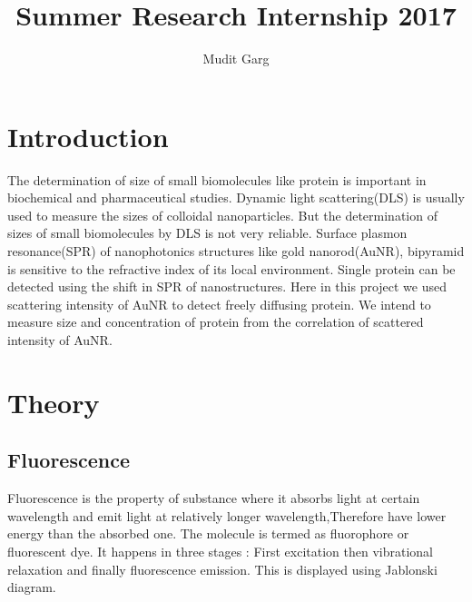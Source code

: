 \documentclass[twoside,single]{lion-msc}
\title{Summer Research Internship 2017}
\author{Mudit Garg}
\affiliation{Indian Institute of Technology Delhi}   %
\begin{document}


\maketitle

\tableofcontents
\cleardoublepage




\chapter{Introduction}

The determination of size of small biomolecules like protein is important in biochemical and pharmaceutical studies. Dynamic light scattering(DLS) is usually used to  measure the sizes of colloidal nanoparticles. But the determination of sizes of small biomolecules by DLS is not very reliable. Surface plasmon resonance(SPR) of nanophotonics structures like gold nanorod(AuNR), bipyramid is sensitive to the refractive index of its local environment. Single protein can be detected using the shift in SPR of nanostructures\cite{AuNR4}. Here in this project we used scattering intensity of AuNR to detect freely diffusing protein. We intend to measure size and concentration of protein from the correlation of scattered intensity of AuNR.
\chapter{Theory}

\section{Fluorescence}
Fluorescence is the property of substance where it absorbs light at certain  wavelength and emit light at relatively longer wavelength,Therefore have lower energy than the absorbed one. The molecule is termed as fluorophore or fluorescent dye. It happens in three stages : First excitation then vibrational relaxation and finally fluorescence emission. This is displayed using Jablonski diagram.
\end{document}
